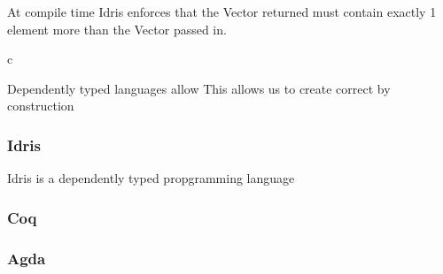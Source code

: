 At compile time Idris enforces that the Vector returned must
contain exactly 1 element more than the Vector passed in.

c

Dependently typed languages allow
This allows us to create correct by construction 


\subsubsection{Idris}

Idris is a dependently typed propgramming language

\subsubsection{Coq}


\subsubsection{Agda}
